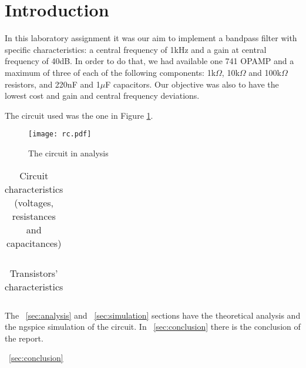 \section{Introduction}
\label {sec:introduction}


In this laboratory assignment it was our aim to implement a bandpass filter with specific characteristics: a central frequency of 1kHz and a gain at central frequency of 40dB. In order to do that, we had available one 741 OPAMP and a maximum of three of each of the following components: 1k$\Omega$, 10k$\Omega$ and 100k$\Omega$ resistors, and 220nF and 1$\mu$F capacitors. Our objective was also to have the lowest cost and gain and central frequency deviations.

The circuit used was the one in Figure \ref{fig:circuit}.


\begin{figure}[H] \centering
\texttt{[image: rc.pdf]}
\caption{The circuit in analysis}
\label{fig:circuit}
\end{figure}


\begin{table}[H]
  \centering
  \begin{tabular}{|c|c|}
    \hline
      
  \end{tabular}
  \caption{Circuit characteristics (voltages, resistances and capacitances)}
  \label{tab:resistance}
\end{table}

\begin{table}[H]
  \centering
  \begin{tabular}{|c|c|}
    \hline
      
  \end{tabular}
  \caption{Transistors' characteristics}
  \label{tab:resistance1}
\end{table}

The ~\ref{sec:analysis} and ~\ref{sec:simulation} sections have the theoretical analysis and the ngspice simulation of the circuit. In ~\ref{sec:conclusion} there is the conclusion of the report.


~\ref{sec:conclusion}
